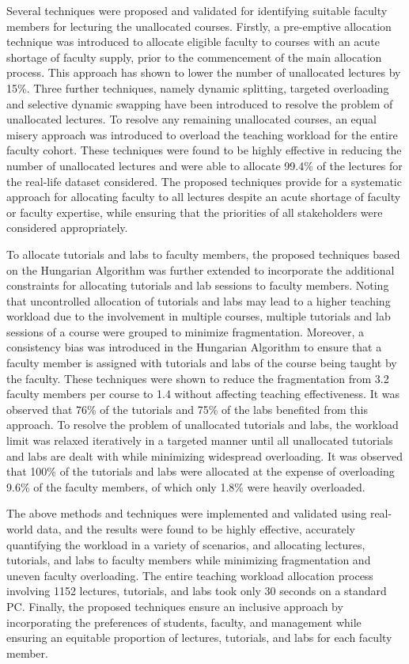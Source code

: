 Several techniques were proposed and validated for identifying suitable faculty members for lecturing the unallocated courses. Firstly, a pre-emptive allocation technique was introduced to allocate eligible faculty to courses with an acute shortage of faculty supply, prior to the commencement of the main allocation process. This approach has shown to lower the number of unallocated lectures by 15\%. Three further techniques, namely dynamic splitting, targeted overloading and selective dynamic swapping have been introduced to resolve the problem of unallocated lectures. To resolve any remaining unallocated courses, an equal misery approach was introduced to overload the teaching workload for the entire faculty cohort. These techniques were found to be highly effective in reducing the number of unallocated lectures and were able to allocate 99.4\% of the lectures for the real-life dataset considered. The proposed techniques provide for a systematic approach for allocating faculty to all lectures despite an acute shortage of faculty or faculty expertise, while ensuring that the priorities of all stakeholders were considered appropriately.

To allocate tutorials and labs to faculty members, the proposed techniques based on the Hungarian Algorithm was further extended to incorporate the additional constraints for allocating tutorials and lab sessions to faculty members. Noting that uncontrolled allocation of tutorials and labs may lead to a higher teaching workload due to the involvement in multiple courses, multiple tutorials and lab sessions of a course were grouped to minimize fragmentation. Moreover, a consistency bias was introduced in the Hungarian Algorithm to ensure that a faculty member is assigned with tutorials and labs of the course being taught by the faculty. These techniques were shown to reduce the fragmentation from 3.2 faculty members per course to 1.4 without affecting teaching effectiveness. It was observed that 76\% of the tutorials and 75\% of the labs benefited from this approach. To resolve the problem of unallocated tutorials and labs, the workload limit was relaxed iteratively in a targeted manner until all unallocated tutorials and labs are dealt with while minimizing widespread overloading. It was observed that 100\% of the tutorials and labs were allocated at the expense of overloading 9.6\% of the faculty members, of which only 1.8\% were heavily overloaded.

The above methods and techniques were implemented and validated using real-world data, and the results were found to be highly effective, accurately quantifying the workload in a variety of scenarios, and allocating lectures, tutorials, and labs to faculty members while minimizing fragmentation and uneven faculty overloading. The entire teaching workload allocation process involving 1152 lectures, tutorials, and labs took only 30 seconds on a standard PC. Finally, the proposed techniques ensure an inclusive approach by incorporating the preferences of students, faculty, and management while ensuring an equitable proportion of lectures, tutorials, and labs for each faculty member.

